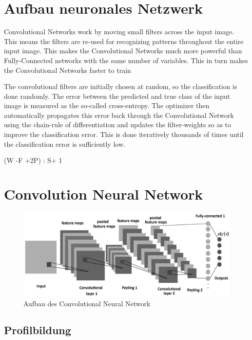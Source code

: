 \section{Aufbau neuronales Netzwerk}


Convolutional Networks work by moving small filters across the input image. This means the filters are re-used for recognizing patterns throughout the entire input image. This makes the Convolutional Networks much more powerful than Fully-Connected networks with the same number of variables. This in turn makes the Convolutional Networks faster to train




The convolutional filters are initially chosen at random, so the classification is done randomly. The error between the predicted and true class of the input image is measured as the so-called cross-entropy. The optimizer then automatically propagates this error back through the Convolutional Network using the chain-rule of differentiation and updates the filter-weights so as to improve the classification error. This is done iteratively thousands of times until the classification error is sufficiently low.


(W -F +2P) : S+ 1

\section{Convolution Neural Network}


\begin{figure}[H]
	\centering
	\includegraphics[width=1\textwidth]
	{fig/CCN.png}
	\caption[Aufbau des Convolutional Neural Network]{Aufbau des Convolutional Neural Network}
	\label{fig:CCN}
\end{figure}



\subsection{Profilbildung}




